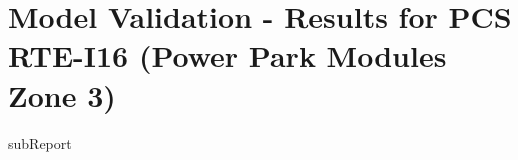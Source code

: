




    \section{Model Validation - Results for PCS RTE-I16 (Power Park Modules Zone 3)}

    {{subReport}}
    \newpage

